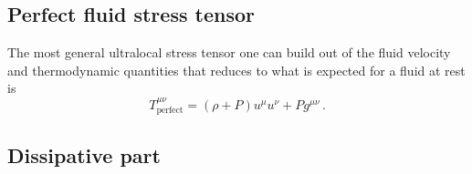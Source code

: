 \documentclass[12pt,a4paper]{article}
\begin{document}
\subsection{Perfect fluid stress tensor}\label{sec:blkstr}


The most general ultralocal stress tensor one can build out of the
fluid velocity and thermodynamic quantities that reduces to what is
expected for a fluid at rest is
\cite[ch.22]{Misner+ThorneETAL-Grav:73}
%
\begin{equation}\label{blkstr:eq}
  T^{\mu\nu}_\mathrm{perfect} = (\rho+P) u^\mu u^\nu + P g^{\mu\nu}\,.
\end{equation}
%


\subsection{Dissipative part}\label{sec:visc}
\end{document}
